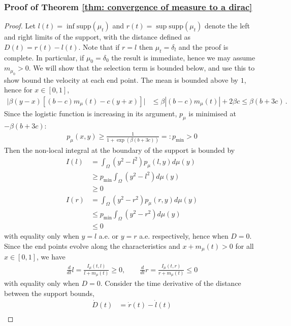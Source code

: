\documentclass[10pt]{article}
\begin{document}
\subsubsection*{Proof of Theorem \ref{thm: convergence of measure to a dirac}}
\begin{proof}
    Let $l(t) = \inf \text{supp}(\mu_t)$ and $r(t) = \sup \text{supp}(\mu_t)$ denote the left and right limits of the support, with the distance defined as $D(t) = r(t)-l(t)$. Note that if $r=l$ then $\mu_t = \delta_l$ and the proof is complete. In particular, if $\mu_0 = \delta_0$ the result is immediate, hence we may assume $m_{\mu_0} >0$. We will show that the selection term is bounded below, and use this to show bound the velocity at each end point. The mean is bounded above by $1$, hence for $x\in[0,1]$, 
    \begin{align*}
        \bigg|\beta(y-x)[(b-c)m_\mu(t) - c(y+x)]\bigg|&\leq \beta|(b-c)m_\mu(t) | + 2\beta c\leq \beta(b+3c) \,.
    \end{align*}
    Since the logistic function is increasing in its argument, $p_\mu$ is minimised at $-\beta(b+3c)$:
    \begin{align*}
        p_\mu(x,y) \geq \frac{1}{1+\exp(\beta(b+3c))} =: p_{\min} >0
    \end{align*}
    Then the non-local integral at the boundary of the support is bounded by
    \begin{align*}
        I(l) &= \int_\Omega (y^2-l^2) p_\mu(l,y)d\mu(y)\\
        &\geq p_{\min} \int_\Omega(y^2-l^2)d\mu(y) \\
        &\geq0\\
        I(r) &= \int_\Omega (y^2-r^2) p_\mu(r,y)d\mu(y)\\
        &\leq p_{\min} \int_\Omega(y^2-r^2)d\mu(y)\\
        &\leq 0
    \end{align*}
    with equality only when $y=l$ a.e. or $y=r$ a.e. respectively, hence when $D=0$. Since the end points evolve along the characteristics and $x +m_\mu(t) >0$ for all $x \in [0,1]$, we have
    \begin{align*}
        \frac{d}{dt}l = \frac{I_\mu(t,l)}{l + m_\mu(t)} \geq0,\qquad
        \frac{d}{dt}r = \frac{I_\mu(t,r)}{r + m_\mu(t)} \leq0
    \end{align*}
    with equality only when $D=0$. Consider the time derivative of the distance between the support bounds,
    \begin{align*}
        \dot{D}(t) &= \dot{r}(t) - \dot{l}(t)\\

\end{align*}
\end{proof}
\end{document}
